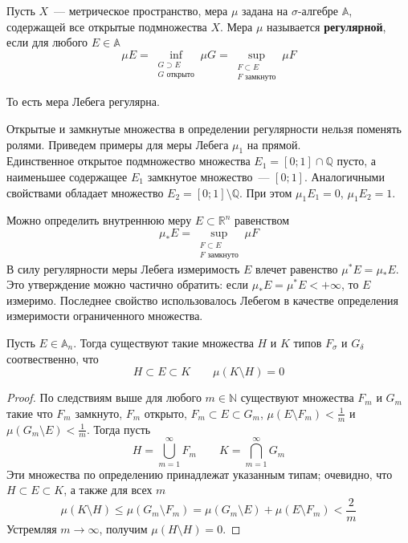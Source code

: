 \documentclass{article}
\begin{document}
    \begin{definition}
        Пусть $X$~--- метрическое пространство, мера $\mu$ задана на $\sigma$-алгебре $\mathbb A$, содержащей все открытые подмножества $X$. Мера $\mu$ называется \textbf{регулярной}, если для любого $E\in\mathbb A$
        $$
        \mu E=\inf\limits_{\substack{G\supset E\\G\text{ открыто}}}\mu G=\sup\limits_{\substack{F\subset E\\F\text{ замкнуто}}}\mu F
        $$
    \end{definition}
    \begin{remark}
        То есть мера Лебега регулярна.
    \end{remark}
    \begin{remark}
        Открытые и замкнутые множества в определении регулярности нельзя поменять ролями. Приведем примеры для меры Лебега $\mu_1$ на прямой.\\
        Единственное открытое подмножество множества $E_1=[0;1]\cap\mathbb Q$ пусто, а наименьшее содержащее $E_1$ замкнутое множество~--- $[0;1]$. Аналогичными свойствами обладает множество $E_2=[0;1]\setminus\mathbb Q$. При этом $\mu_1E_1=0$, $\mu_1E_2=1$.
    \end{remark}
    \begin{remark}
        Можно определить внутреннюю меру $E\subset\mathbb R^n$ равенством
        $$
        \mu_*E=\sup\limits_{\substack{F\subset E\\F\text{ замкнуто}}}\mu F
        $$
        В силу регулярности меры Лебега измеримость $E$ влечет равенство $\mu^*E=\mu_*E$. Это утверждение можно частично обратить: если $\mu_*E=\mu^*E<+\infty$, то $E$ измеримо. Последнее свойство использовалось Лебегом в качестве определения измеримости ограниченного множества.
    \end{remark}
    \begin{theorem}
        \label{Приближение измеримых множеств борелевскими}
        Пусть $E\in\mathbb A_n$. Тогда существуют такие множества $H$ и $K$ типов $F_\sigma$ и $G_\delta$ соотвественно, что
        $$
        H\subset E\subset K\qquad\mu(K\setminus H)=0
        $$
    \end{theorem}
    \begin{proof}
        По следствиям выше для любого $m\in\mathbb N$ существуют множества $F_m$ и $G_m$ такие что $F_m$ замкнуто, $F_m$ открыто, $F_m\subset E\subset G_m$, $\mu(E\setminus F_m)<\frac1m$ и $\mu(G_m\setminus E)<\frac1m$. Тогда пусть
        $$
        H=\bigcup\limits_{m=1}^\infty F_m\qquad K=\bigcap\limits_{m=1}^\infty G_m
        $$
        Эти множества по определению принадлежат указанным типам; очевидно, что $H\subset E\subset K$, а также для всех $m$
        $$
        \mu(K\setminus H)\leqslant\mu(G_m\setminus F_m)=\mu(G_m\setminus E)+\mu(E\setminus F_m)<\frac2m
        $$
        Устремляя $m\to\infty$, получим $\mu(H\setminus H)=0$.
    \end{proof}
\end{document}
